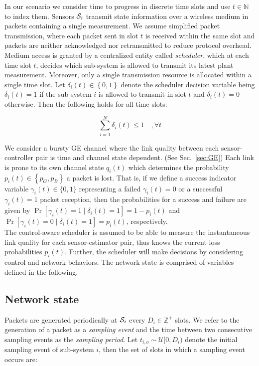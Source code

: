 In our scenario we consider time to progress in discrete time slots and use $t
\in \mathbb{N}$ to index them. Sensors $\mathcal{S}_i$ transmit state information over
a wireless medium in packets containing a single measurement. We assume
simplified packet transmission, where each packet sent in slot $t$ is received
within the same slot and packets are neither acknowledged nor retransmitted to
reduce protocol overhead. Medium access is granted by a centralized entity
called \textit{scheduler}, which at each time slot $t$, decides which sub-system
is allowed to transmit its latest plant measurement. Moreover, only a single
transmission resource is allocated within a single time slot. Let $\delta_i(t)
\in \left\{0,1\right\}$ denote the scheduler decision variable being
$\delta_i(t)=1$ if the sub-system $i$ is allowed to transmit in slot $t$ and
$\delta_i(t)=0$ otherwise. Then the following holds for all time slots:

\begin{equation}
  \sum_{i=1}^{N}{\delta_i(t) \leq 1 \quad, \forall t}
\end{equation}

We consider a bursty GE channel where the link quality between each
sensor-controller pair is time and channel state dependent. (See
Sec.~{\ref{sec:GE}}) Each link is prone to its own channel state $q_i(t)$ which
determines the probability $p_i(t) \in \left\{p_G,p_B\right\}$ a packet is lost.
That is, if we define a success indicator variable $\gamma_i(t)\in\{0,1\}$
representing a failed $\gamma_i(t)=0$ or a successful $\gamma_i(t)=1$ packet
reception, then the probabilities for a success and failure are given by
$\Pr[\gamma_i(t)=1 \mid \delta_i(t)=1] = 1-p_i(t)$ and  $\Pr[\gamma_i(t)=0 \mid
\delta_i(t)=1] = p_i(t)$, respectively. \\ 
The control-aware scheduler is assumed to be able to measure the instantaneous
link quality for each sensor-estimator pair, thus knows the current loss
probabilities $p_i(t)$. Further, the scheduler will make decisions by
considering control and network behaviors. The network state is comprised of
variables defined in the following.

\subsection{Network state}

Packets are generated periodically at $\mathcal{S}_i$ every $D_i \in \mathbb{Z}^+$
slots. We refer to the generation of a packet as a \textit{sampling event} and
the time between two consecutive sampling events as the \textit{sampling
period}. Let $t_{i,o} \sim \mathcal{U}[0, D_i)$ denote the initial sampling
event of sub-system $i$, then the set of slots in which a sampling event occurs
are:

